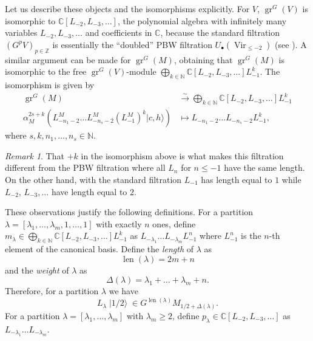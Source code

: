 \documentclass[a4paper, 12pt, reqno]{amsart}
\theoremstyle{remark}
\newtheorem{remark}[theorem]{Remark}
\DeclareMathOperator{\Vir}{Vir}
\DeclareMathOperator{\gr}{gr}
\DeclareMathOperator{\len}{len}
\DeclareMathOperator{\vachalf}{|1/2\rangle}
\begin{document}
Let us describe these objects and the isomorphisms explicitly.
For $V$, $\gr^G(V)$ is isomorphic to $\mathbb{C}[L_{-2}, L_{-3}, \dots]$, the polynomial algebra with infinitely many variables $L_{-2}, L_{-3}, \dots$ and coefficients in $\mathbb{C}$, because the standard filtration $(G^pV)_{p \in \mathbb{Z}}$ is essentially the ``doubled'' PBW filtration $U_\bullet(\Vir_{\le -2})$ (see \cite{arakawa_remark_2012}).
A similar argument can be made for $\gr^G(M)$, obtaining that $\gr^G(M)$ is isomorphic to the free $\gr^G(V)$-module $\bigoplus_{k \in \mathbb{N}}\mathbb{C}[L_{-2}, L_{-3}, \dots]L_{-1}^k$.
The isomorphism is given by
\begin{align*}
    \gr^G(M) &\xrightarrow{\sim} \bigoplus_{k \in \mathbb{N}}\mathbb{C}[L_{-2}, L_{-3}, \dots]L_{-1}^k \\
    \alpha_M^{2s + k}(L_{-n_1 - 2}^M\dots L_{-n_s - 2}^M(L_{-1}^M)^k|c, h\rangle) &\mapsto L_{-n_1 - 2}\dots L_{-n_s - 2}L_{-1}^k,
  \end{align*}
  where $s, k, n_1, \dots, n_s \in \mathbb{N}$.

\begin{remark}
  \label{rmk:4}
  That $+k$ in the isomorphism above is what makes this filtration different from the PBW filtration where all $L_n$ for $n \le -1$ have the same length.
  On the other hand, with the standard filtration $L_{-1}$ has length equal to $1$ while $L_{-2}$, $L_{-3}, \dots$ have length equal to $2$.
\end{remark}

These observations justify the following definitions.
For a partition $\lambda = [\lambda_1, \dots, \lambda_m, 1, \dots, 1]$ with exactly $n$ ones, define $m_\lambda \in \bigoplus_{k \in \mathbb{N}}\mathbb{C}[L_{-2}, L_{-3}, \dots]L_{-1}^k$ as $L_{-\lambda_1}\dots L_{-\lambda_m}L_{-1}^n$ where $L_{-1}^n$ is the $n$-th element of the canonical basis.
Define the \emph{length} of $\lambda$ as
\begin{equation*}
  \len(\lambda) = 2m + n
\end{equation*}
and the \emph{weight} of $\lambda$ as
\begin{equation*}
  \Delta(\lambda) = \lambda_1 + \dots + \lambda_m + n.
\end{equation*}
Therefore, for a partition $\lambda$ we have
\begin{equation*}
  L_{\lambda}\vachalf \in G^{\len(\lambda)}M_{1/2 + \Delta(\lambda)}.
\end{equation*}
For a partition $\lambda = [\lambda_1, \dots, \lambda_m]$ with $\lambda_m \ge 2$, define $p_{\lambda} \in \mathbb{C}[L_{-2}, L_{-3}, \dots]$ as $L_{-\lambda_1}\dots L_{-\lambda_m}$.
\end{document}
